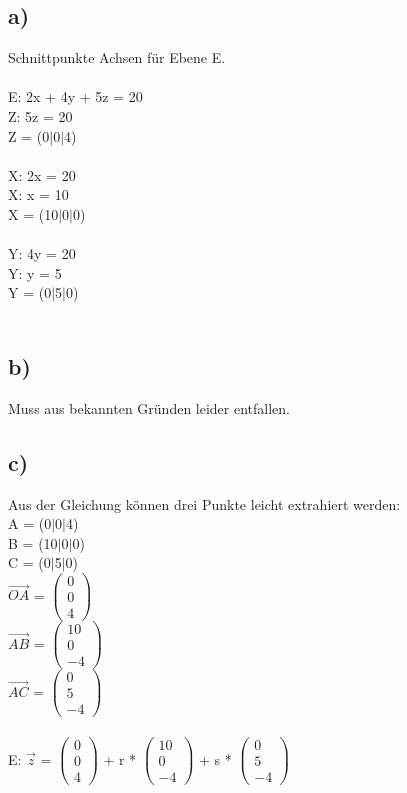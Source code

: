 \documentclass{article}
\begin{document}
	\subsection*{a)}
	Schnittpunkte Achsen für Ebene E. \\ \\
	E: 2x + 4y + 5z = 20 \\
	Z:  5z = 20 \\
	Z = (0$|$0$|$4) \\ \\
	X: 2x = 20 \\
	X: x = 10 \\
	X = (10$|$0$|$0) \\ \\
	Y: 4y = 20 \\
	Y: y = 5 \\
	Y = (0$|$5$|$0) \\ \\
	\subsection*{b)}
	Muss aus bekannten Gründen leider entfallen.
	\subsection*{c)}
	Aus der Gleichung können drei Punkte leicht extrahiert werden: \\
	A = (0$|$0$|$4)  \\
	B = (10$|$0$|$0)  \\
	C = (0$|$5$|$0) \\
	$\vec{OA}$ =
	$\left(\begin{array}{c}
	0 \\ 0 \\ 4
	\end{array}\right)$ \\
	$\vec{AB}$ =
	$\left(\begin{array}{c}
	10 \\ 0 \\ -4
	\end{array}\right)$ \\
	$\vec{AC}$ =
	$\left(\begin{array}{c}
	0 \\ 5 \\ -4
	\end{array}\right)$ \\
	\\
	E: $\vec{z}$ = 
	$\left(\begin{array}{c}
	0 \\ 0 \\ 4
	\end{array}\right)$ + r *
	$\left(\begin{array}{c}
	10 \\ 0 \\ -4
	\end{array}\right)$ + s *
		$\left(\begin{array}{c}
	0 \\ 5 \\ -4
	\end{array}\right)$
\end{document}
